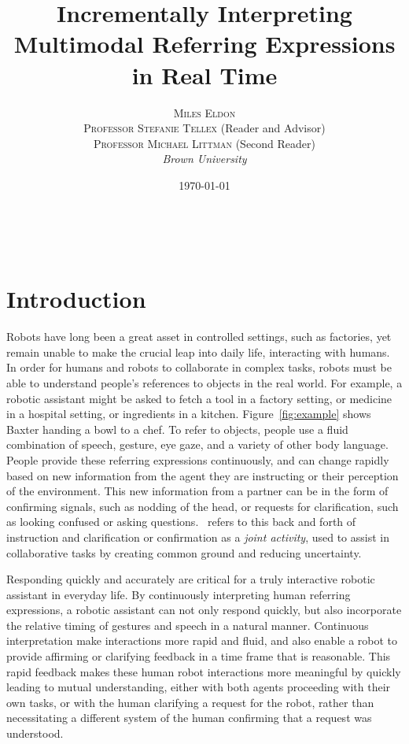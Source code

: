 \documentclass[a4paper, 11pt]{article} %
\title{\textbf{Incrementally Interpreting Multimodal Referring Expressions in Real Time}} %
\author{\textsc{Miles Eldon}\\ %
\textsc{Professor Stefanie Tellex} (Reader and Advisor)\\
{\textsc{Professor Michael Littman} (Second Reader)}
\\{\textit{Brown University}}} %
\date{\today} %
\makeatletter
\renewcommand{\maketitle}{ %
\begin{flushright} %
{\LARGE\@title} %

\vspace{50pt} %

{\large\@author} %
\\\@date %

\vspace{40pt} %
\end{flushright}
}
\makeatother
\begin{document}
\maketitle %
\newpage
\tableofcontents
\newpage
\section{Introduction}
Robots have long been a great asset in controlled settings, such as factories, yet remain unable to make the crucial leap into daily life, interacting with humans. In order for humans and robots to collaborate in complex tasks, robots must be able to understand people's references to objects in the real world. For example, a robotic assistant might be asked to fetch a tool in a factory setting, or medicine in a hospital setting, or ingredients in a kitchen. Figure~\ref{fig:example} shows Baxter handing a bowl to a chef. To refer to objects, people use a fluid combination of speech, gesture, eye gaze, and a variety of other body language. People provide these referring expressions continuously, and can change rapidly based on new information from the agent they are instructing or their perception of the environment. This new information from a partner can be in the form of confirming signals, such as nodding of the head, or requests for clarification, such as looking confused or asking questions.~\citet{clark96} refers to this back and forth of instruction and clarification or confirmation as a \textit{joint activity}, used to assist in collaborative tasks by creating common ground and reducing uncertainty.


Responding quickly and accurately are critical for a truly interactive robotic assistant in everyday life. By continuously interpreting human referring expressions, a robotic assistant can not only respond quickly, but also incorporate the relative timing of gestures and speech in a natural manner. Continuous interpretation make interactions more rapid and fluid, and also enable a robot to provide affirming or clarifying feedback in a time frame that is reasonable. This rapid feedback makes these human robot interactions more meaningful by quickly leading to mutual understanding, either with both agents proceeding with their own tasks, or with the human clarifying a request for the robot, rather than necessitating a different system of the human confirming that a request was understood.
\end{document}
